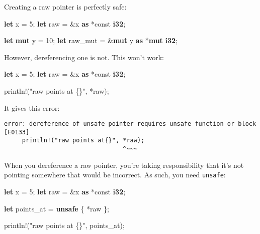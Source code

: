 \documentclass[a4paper,]{book}
\newenvironment{Shaded}{\begin{snugshade}}{\end{snugshade}}
\newcommand{\KeywordTok}[1]{\textcolor[rgb]{0.13,0.29,0.53}{\textbf{{#1}}}}
\newcommand{\DecValTok}[1]{\textcolor[rgb]{0.00,0.00,0.81}{{#1}}}
\newcommand{\StringTok}[1]{\textcolor[rgb]{0.31,0.60,0.02}{{#1}}}
\newcommand{\OtherTok}[1]{\textcolor[rgb]{0.56,0.35,0.01}{{#1}}}
\newcommand{\NormalTok}[1]{{#1}}
\begin{document}
Creating a raw pointer is perfectly safe:

\begin{Shaded}
\begin{Highlighting}[]
\KeywordTok{let} \NormalTok{x = }\DecValTok{5}\NormalTok{;}
\KeywordTok{let} \NormalTok{raw = &x }\KeywordTok{as} \NormalTok{*const }\KeywordTok{i32}\NormalTok{;}

\KeywordTok{let} \KeywordTok{mut} \NormalTok{y = }\DecValTok{10}\NormalTok{;}
\KeywordTok{let} \NormalTok{raw_mut = &}\KeywordTok{mut} \NormalTok{y }\KeywordTok{as} \NormalTok{*}\KeywordTok{mut} \KeywordTok{i32}\NormalTok{;}
\end{Highlighting}
\end{Shaded}

However, dereferencing one is not. This won't work:

\begin{Shaded}
\begin{Highlighting}[]
\KeywordTok{let} \NormalTok{x = }\DecValTok{5}\NormalTok{;}
\KeywordTok{let} \NormalTok{raw = &x }\KeywordTok{as} \NormalTok{*const }\KeywordTok{i32}\NormalTok{;}

\OtherTok{println!}\NormalTok{(}\StringTok{"raw points at \{\}"}\NormalTok{, *raw);}
\end{Highlighting}
\end{Shaded}

It gives this error:

\begin{verbatim}
error: dereference of unsafe pointer requires unsafe function or block [E0133]
     println!("raw points at{}", *raw);
                                 ^~~~
\end{verbatim}

When you dereference a raw pointer, you're taking responsibility that
it's not pointing somewhere that would be incorrect. As such, you need
\texttt{unsafe}:

\begin{Shaded}
\begin{Highlighting}[]
\KeywordTok{let} \NormalTok{x = }\DecValTok{5}\NormalTok{;}
\KeywordTok{let} \NormalTok{raw = &x }\KeywordTok{as} \NormalTok{*const }\KeywordTok{i32}\NormalTok{;}

\KeywordTok{let} \NormalTok{points_at = }\KeywordTok{unsafe} \NormalTok{\{ *raw \};}

\OtherTok{println!}\NormalTok{(}\StringTok{"raw points at \{\}"}\NormalTok{, points_at);}
\end{Highlighting}
\end{Shaded}
\end{document}

